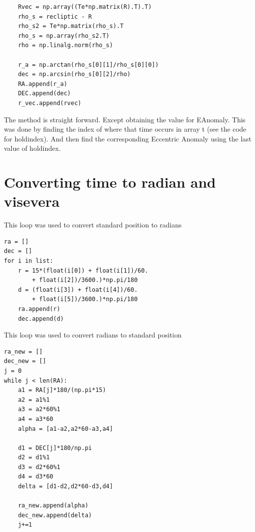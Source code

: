 \documentclass[a4paper,12pt]{article}
\begin{document}
\begin{appendices}
\begin{lstlisting}
    Rvec = np.array((Te*np.matrix(R).T).T)
    rho_s = recliptic - R
    rho_s2 = Te*np.matrix(rho_s).T
    rho_s = np.array(rho_s2.T)
    rho = np.linalg.norm(rho_s)
    
    r_a = np.arctan(rho_s[0][1]/rho_s[0][0])
    dec = np.arcsin(rho_s[0][2]/rho)
    RA.append(r_a)
    DEC.append(dec)
    r_vec.append(rvec)

\end{lstlisting}
The method is straight forward. Except obtaining the value for EAnomaly. This was done by finding the index of where that time occurs in array t (see the code for holdindex). And then find the corresponding Eccentric Anomaly using the last value of holdindex.

\section{Converting time to radian and visevera}
This loop was used to convert standard position to radians
\begin{lstlisting}
ra = []
dec = []
for i in list:
    r = 15*(float(i[0]) + float(i[1])/60. 
        + float(i[2])/3600.)*np.pi/180
    d = (float(i[3]) + float(i[4])/60. 
        + float(i[5])/3600.)*np.pi/180
    ra.append(r)
    dec.append(d)
\end{lstlisting}

This loop was used to convert radians to standard position
\begin{lstlisting}
ra_new = []
dec_new = []
j = 0
while j < len(RA):
    a1 = RA[j]*180/(np.pi*15)
    a2 = a1%1
    a3 = a2*60%1
    a4 = a3*60
    alpha = [a1-a2,a2*60-a3,a4]
    
    d1 = DEC[j]*180/np.pi
    d2 = d1%1
    d3 = d2*60%1
    d4 = d3*60
    delta = [d1-d2,d2*60-d3,d4]
    
    ra_new.append(alpha)
    dec_new.append(delta)
    j+=1
\end{lstlisting}

\end{appendices}



\end{document}
